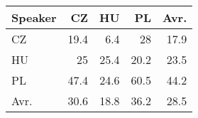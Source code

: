 \begin{tabular}{l|rrr|r}
\hline
 Speaker   &   CZ &   HU &   PL &   Avr. \\
\hline
 CZ        & 19.4 &  6.4 & 28   &   17.9 \\
 HU        & 25   & 25.4 & 20.2 &   23.5 \\
 PL        & 47.4 & 24.6 & 60.5 &   44.2 \\
\hline
 Avr.      & 30.6 & 18.8 & 36.2 &   28.5 \\
\hline
\end{tabular}
